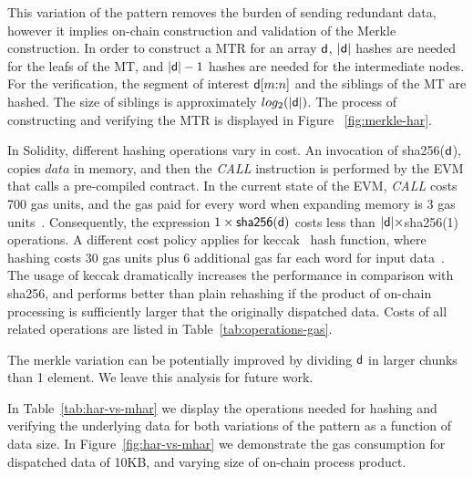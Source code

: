 This variation of the pattern removes the burden of sending redundant data,
however it implies on-chain construction and validation of the Merkle
construction. In order to construct a MTR for an array $\mathsf{d}$,
$|\mathsf{d}|$ hashes are needed for the leafs of the MT, and $|\mathsf{d}| -
1$ hashes are needed for the intermediate nodes. For the verification, the
segment of interest $\mathsf{d}[m{:}n]$ and the siblings of the MT are hashed.
The size of siblings is approximately $log_2(|\mathsf{d}|)$. The process of
constructing and verifying the MTR is displayed in Figure
~\ref{fig:merkle-har}.

In Solidity, different hashing operations vary in cost. An invocation of
\textsf{sha256}($\mathsf{d}$), copies $data$ in memory, and then the
\emph{CALL} instruction is performed by the EVM that calls a pre-compiled
contract. In the current state of the EVM, \emph{CALL} costs 700 gas units, and
the gas paid for every word when expanding memory is 3 gas units~\cite{wood}.
Consequently, the expression $1 \times \textsf{sha256}(\mathsf{d})$ costs less than
$|\mathsf{d}| \times $\textsf{sha256}(1) operations. A different cost policy applies
for \textsf{keccak}~\cite{keccak} hash function, where hashing costs 30 gas
units plus 6 additional gas far each word for input data~\cite{wood}. The usage
of \textsf{keccak} dramatically increases the performance in comparison with
\textsf{sha256}, and performs better than plain rehashing if the product of
on-chain processing is sufficiently larger that the originally dispatched data.
Costs of all related operations are listed in Table~\ref{tab:operations-gas}.

The merkle variation can be potentially improved by dividing $\mathsf{d}$ in larger
chunks than 1 element. We leave this analysis for future work.



In Table~\ref{tab:har-vs-mhar} we display the operations needed for hashing and
verifying the underlying data for both variations of the pattern as a function
of data size. In Figure~\ref{fig:har-vs-mhar} we demonstrate the gas
consumption for dispatched data of 10KB, and varying size of on-chain
process product.



